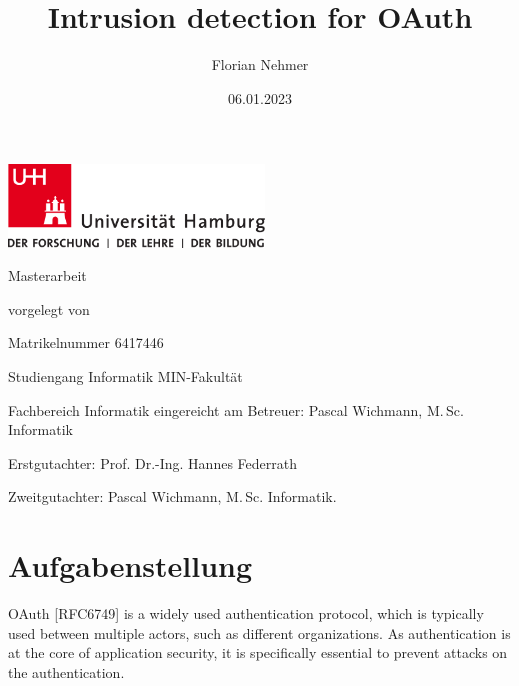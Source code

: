 \documentclass[
    fontsize=12pt,
    headings=small,
    parskip=half,           %
    bibliography=totoc,
    numbers=noenddot,       %
    open=any,               %
    ]{scrreprt}
\title{Intrusion detection for OAuth}
\author{Florian Nehmer}
\date{06.01.2023} %
\begin{document}
\begin{titlepage}%
	\includegraphics[width=6.8cm]{./pic/up-uhh-logo-u-2010-u-farbe-u-rgb.pdf}
	\begin{center}\Large
		\vfill
		Masterarbeit
		\vfill
		\makeatletter
		{\Large\textsf{\textbf{\@title}}\par}
		\makeatother
		\vfill
		vorgelegt von
		\par\bigskip
		\makeatletter
		{\@author} \par
		\makeatother
		Matrikelnummer 6417446 \par
		Studiengang Informatik
		\vfill
		MIN-Fakultät \par
		Fachbereich Informatik
		\vfill
		\makeatletter
		eingereicht am {\@date}
		\makeatother
		\vfill
		Betreuer: Pascal Wichmann, M.\,Sc. Informatik \par
		Erstgutachter: Prof. Dr.-Ing. Hannes Federrath \par
		Zweitgutachter: Pascal Wichmann, M.\,Sc. Informatik.
	\end{center}
\end{titlepage}%

\chapter*{Aufgabenstellung}
OAuth [RFC6749] is a widely used authentication protocol, which is typically used between multiple actors, such as different organizations. As authentication is at the core of application security, it is specifically essential to prevent attacks on the authentication.
\end{document}
